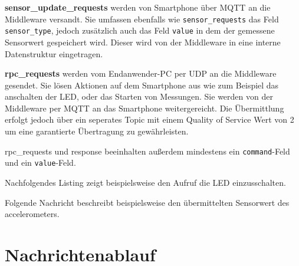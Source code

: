 \documentclass[11pt,a4paper]{report}
\begin{document}
\textbf{sensor\_update\_requests} werden von Smartphone über MQTT an die Middleware versandt.
Sie umfassen ebenfalls wie \texttt{sensor\_requests} das Feld \texttt{sensor\_type}, jedoch zusätzlich auch das Feld \texttt{value} in dem der gemessene Sensorwert gespeichert wird.
Dieser wird von der Middleware in eine interne Datenstruktur eingetragen.

\textbf{rpc\_requests} werden vom Endanwender-PC per UDP an die Middleware gesendet.
Sie lösen Aktionen auf dem Smartphone aus wie zum Beispiel das anschalten der LED, oder das Starten von Messungen.
Sie werden von der Middleware per MQTT an das Smartphone weitergereicht.
Die Übermittlung erfolgt jedoch über ein seperates Topic mit einem Quality of Service Wert von 2 um eine garantierte Übertragung zu gewährleisten.

rpc\_requests und response beeinhalten außerdem mindestens ein \texttt{command}-Feld und ein \texttt{value}-Feld.

Nachfolgendes Listing zeigt beispielsweise den Aufruf die LED einzusschalten.


Folgende Nachricht beschreibt beispielsweise den übermittelten Sensorwert des accelerometers.


\section{Nachrichtenablauf}
\end{document}
